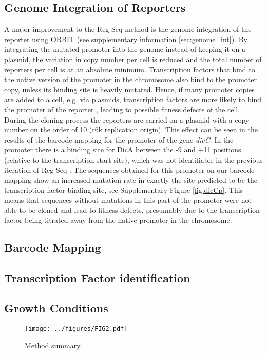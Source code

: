\subsection{Genome Integration of Reporters}
A major improvement to the Reg-Seq method is the genome integration of the reporter using ORBIT (see supplementary information \ref{sec:genome_int}). By integrating the mutated promoter into the genome instead of keeping it on a plasmid, the variation in copy number per cell is reduced and the total number of reporters per cell is at an absolute minimum. Transcription factors that bind to the native version of the promoter in the chromosome also bind to the promoter copy, unless its binding site is heavily mutated. Hence, if many promoter copies are added to a cell, e.g. via plasmids, transcription factors are more likely to bind the promoter of the reporter \cite{brewster2014transcription}, leading to possible fitness defects of the cell. During the cloning process the reporters are carried on a plasmid with a copy number on the order of 10 (r6k replication origin). This effect can be seen in the results of the barcode mapping for the promoter of the gene \textit{dicC}. In the promoter there is a binding site for DicA between the -9 and +11 positions (relative to the transcription start site), which was not identifiable in the previous iteration of Reg-Seq \cite{ireland2020deciphering}. The sequences obtained for this promoter on our barcode mapping show an increased mutation rate in exactly the site predicted to be the transcription factor binding site, see Supplementary Figure \ref{fig:dicCp}. This means that sequences without mutations in this part of the promoter were not able to be cloned and lead to fitness defects, presumably due to the transcription factor being titrated away from the native promoter in the chromosome.

\subsection{Barcode Mapping}

\subsection{Transcription Factor identification}
\subsection{Growth Conditions}
\begin{figure}
    \centering
    \texttt{[image: ../figures/FIG2.pdf]}
    \caption{Method summary}
    \label{fig:method_sum}
\end{figure}
